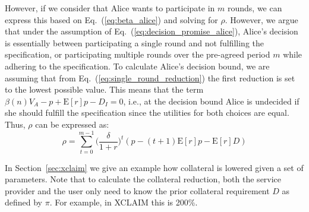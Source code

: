 \documentclass[runningheads]{llncs}
\newcommand{\sys}{Promise\xspace}
\begin{document}
However, if we consider that Alice wants to participate in $m$ rounds, we can express this based on Eq.~(\ref{eq:beta_alice}) and solving for $\rho$.
However, we argue that under the assumption of Eq.~(\ref{eq:decision_promise_alice}), Alice's decision is essentially between participating a single round and not fulfilling the specification, or participating multiple rounds over the pre-agreed period $m$ while adhering to the specification.
To calculate Alice's decision bound, we are assuming that from Eq.~(\ref{eq:single_round_reduction}) the first reduction is set to the lowest possible value.
This means that the term $\beta(n)V_A - p + \mathrm{E}[r]p - D_I = 0$, i.e., at the decision bound Alice is undecided if she should fulfill the specification since the utilities for both choices are equal.
Thus, $\rho$ can be expressed as:
\begin{equation}
    \label{eq:multi_round_reduction}
    \rho = \sum_{t=0}^{m-1} \big( \frac{\delta}{1+r} \big)^{t} ( p - (t+1)\mathrm{E}[r]p - \mathrm{E}[r]D)
\end{equation}

In Section~\ref{sec:xclaim} we give an example how collateral is lowered given a set of parameters.
Note that to calculate the collateral reduction, both the service provider and the user only need to know the prior collateral requirement $D$ as defined by $\pi$.
For example, in XCLAIM this is 200\%.





\end{document}
